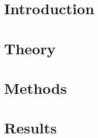 \documentclass[
  10pt,
  b5paper,
  oneside
]{thesis}
\begin{document}
  
    
  \mainmatter
    
    \chapter{Introduction}
      

    \chapter{Theory}
      
 
    \chapter{Methods}
      

    \chapter{Results}
      


  \backmatter
    
    \begin{appendices}
      
    \end{appendices}
    
\end{document}
